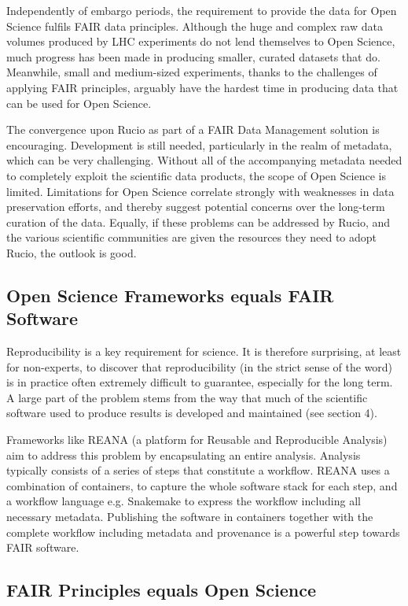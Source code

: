 Independently of embargo periods, the requirement to provide the data for Open Science fulfils FAIR data principles.  Although the huge and complex raw data volumes produced by LHC experiments do not lend themselves to Open Science, much progress has been made in producing smaller, curated datasets that do.  Meanwhile, small and medium-sized experiments, thanks to the challenges of applying FAIR principles, arguably have the hardest time in producing data that can be used for Open Science.

The convergence upon Rucio as part of a FAIR Data Management solution is encouraging.  Development is still needed, particularly in the realm of metadata, which can be very challenging.  Without all of the accompanying metadata needed to completely exploit the scientific data products, the scope of Open Science is limited.  Limitations for Open Science correlate strongly with weaknesses in data preservation efforts, and thereby suggest potential concerns over the long-term curation of the data.  Equally, if these problems can be addressed by Rucio, and the various scientific communities are given the resources they need to adopt Rucio, the outlook is good.

\subsection{Open Science Frameworks equals FAIR Software}

Reproducibility is a key requirement for science.  It is therefore surprising, at least for non-experts, to discover that reproducibility (in the strict sense of the word) is in practice often extremely difficult to guarantee, especially for the long term. A large part of the problem stems from the way that much of the scientific software used to produce results is developed and maintained (see section 4).

Frameworks like REANA (a platform for Reusable and Reproducible Analysis) aim to address this problem by encapsulating an entire analysis.  Analysis typically consists of a series of steps that constitute a workflow.  REANA uses a combination of containers, to capture the whole software stack for each step, and a workflow language e.g. Snakemake to express the workflow including all necessary metadata. Publishing the software in containers together with the complete workflow including metadata and provenance is a powerful step towards FAIR software.


\subsection{FAIR Principles equals Open Science}

